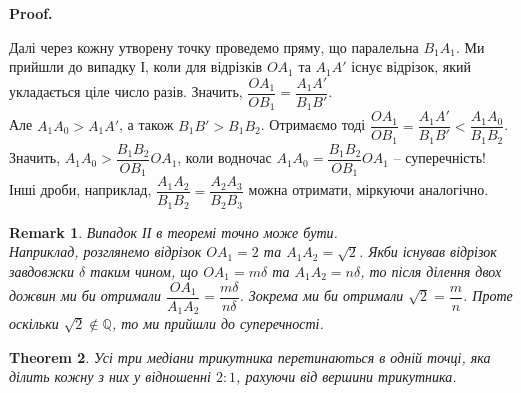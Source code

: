 \documentclass[a4paper, 10pt]{article}
\makeatletter
\theoremstyle{theoremdd}
\newtheorem{theorem}{Theorem}[subsection]
\theoremstyle{theoremdd}
\theoremstyle{theoremdd}
\theoremstyle{theoremdd}
\theoremstyle{theoremdd}
\theoremstyle{theoremdd}
\theoremstyle{theoremdd}
\newtheorem{remark}[theorem]{Remark}
\theoremstyle{theoremdd}
\theoremstyle{theoremdd}
\renewenvironment{proof}[1][Proof.\\]{\par
\pushQED{\hfill \qed}%
\normalfont \topsep6\p@\@plus6\p@\relax
\trivlist
\item\relax
{\bfseries
#1\@addpunct{.}}\hspace\labelsep\ignorespaces
}{%
\popQED\endtrivlist\@endpefalse
}
\makeatother
\begin{document}
\begin{proof}
\begin{figure}[H]
\end{figure}
Далі через кожну утворену точку проведемо пряму, що паралельна $B_1A_1$. Ми прийшли до випадку І, коли для відрізків $OA_1$ та $A_1A'$ існує відрізок, який укладається ціле число разів. Значить, $\dfrac{OA_1}{OB_1} = \dfrac{A_1A'}{B_1B'}$.\\
Але $A_1A_0 > A_1A'$, а також $B_1B' > B_1B_2$. Отримаємо тоді $\dfrac{OA_1}{OB_1} = \dfrac{A_1A'}{B_1B'} < \dfrac{A_1A_0}{B_1B_2}$. Значить, $A_1A_0 > \dfrac{B_1B_2}{OB_1}OA_1$, коли водночас $A_1A_0 = \dfrac{B_1B_2}{OB_1} OA_1$ -- суперечність!
\bigskip \\
Інші дроби, наприклад, $\dfrac{A_1A_2}{B_1B_2} = \dfrac{A_2A_3}{B_2B_3}$ можна отримати, міркуючи аналогічно. 
\end{proof}

\begin{remark}
Випадок ІІ в теоремі точно може бути. \\
Наприклад, розглянемо відрізок $OA_1 = 2$ та $A_1A_2 = \sqrt{2}$. Якби існував відрізок завдовжки $\delta$ таким чином, що $OA_1 = m \delta$ та $A_1A_2 = n \delta$, то після ділення двох дожвин ми би отримали $\dfrac{OA_1}{A_1A_2} = \dfrac{m \delta}{n \delta}$. Зокрема ми би отримали $\sqrt{2} = \dfrac{m}{n}$. Проте оскільки $\sqrt{2} \notin \mathbb{Q}$, то ми прийшли до суперечності.
\end{remark}

\begin{theorem}
Усі три медіани трикутника перетинаються в одній точці, яка ділить кожну з них у відношенні $2 : 1$, рахуючи від вершини трикутника.
\end{theorem}
\end{document}
